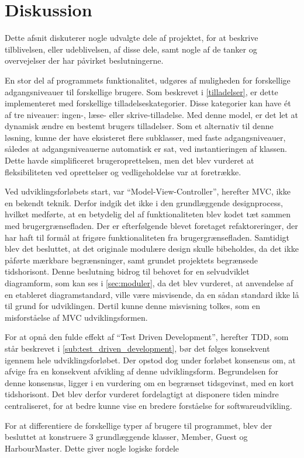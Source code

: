 \chapter{Diskussion}
\label{cha:diskussion}

Dette afsnit diskuterer nogle udvalgte dele af projektet, for at beskrive tilblivelsen, eller udeblivelsen, af disse dele, samt nogle af de tanker og overvejelser der har påvirket beslutningerne.

En stor del af programmets funktionalitet, udgøres af muligheden for forskellige adgangsniveauer til forskellige brugere. Som beskrevet i \cref{tilladelser}, er dette implementeret med forskellige tilladelseskategorier. Disse kategorier kan have ét af tre niveauer: ingen-, læse- eller skrive-tilladelse. Med denne model, er det let at dynamisk ændre en bestemt brugers tilladelser. Som et alternativ til denne løsning, kunne der have eksisteret flere subklasser, med faste adgangsniveauer, således at adgangsniveauerne automatisk er sat, ved instantieringen af klassen. Dette havde simplificeret brugeroprettelsen, men det blev vurderet at fleksibiliteten ved oprettelser og vedligeholdelse var at foretrække.

Ved udviklingsforløbets start, var \enquote{Model-View-Controller}, herefter MVC, ikke en bekendt teknik. Derfor indgik det ikke i den grundlæggende designprocess, hvilket medførte, at en betydelig del af funktionaliteten blev kodet tæt sammen med brugergrænsefladen. Der er efterfølgende blevet foretaget refaktoreringer, der har haft til formål at frigøre funktionaliteten fra brugergrænsefladen. Samtidigt blev det besluttet, at det originale modulære design skulle bibeholdes, da det ikke påførte mærkbare begrænsninger, samt grundet projektets begrænsede tidshorisont. Denne beslutning bidrog til behovet for en selvudviklet diagramform, som kan ses i \cref{sec:moduler}, da det blev vurderet, at anvendelse af en etableret diagramstandard, ville være misvisende, da en sådan standard ikke lå til grund for udviklingen. Dertil kunne denne misvisning tolkes, som en misforståelse af MVC udviklingsformen.

For at opnå den fulde effekt af \enquote{Test Driven Development}, herefter TDD, som står beskrevet i \cref{sub:test_driven_development}, bør det følges konsekvent igennem hele udviklingsforløbet. Der opstod dog under forløbet konsensus om, at afvige fra en konsekvent afvikling af denne udviklingsform. Begrundelsen for denne konsensus, ligger i en vurdering om en begrænset tidsgevinst, med en kort tidshorisont. Det blev derfor vurderet fordelagtigt at disponere tiden mindre centraliseret, for at bedre kunne vise en bredere forståelse for softwareudvikling.


For at differentiere de forskellige typer af brugere til programmet, blev der besluttet at konstruere 3 grundlæggende klasser, Member, Guest og HarbourMaster. Dette giver nogle logiske fordele